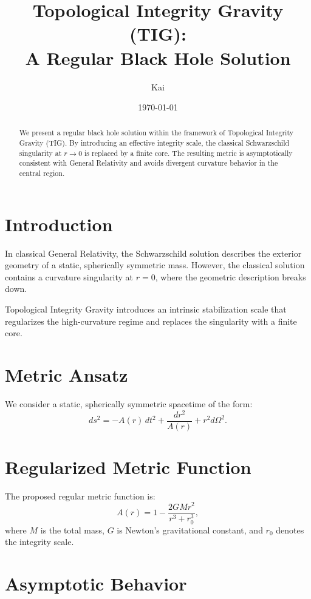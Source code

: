 \documentclass[11pt,a4paper]{article}
\title{\textbf{Topological Integrity Gravity (TIG):\\
A Regular Black Hole Solution}}
\author{Kai}
\date{\today}
\begin{document}
\maketitle

\begin{abstract}
We present a regular black hole solution within the framework of Topological Integrity Gravity (TIG). By introducing an effective integrity scale, the classical Schwarzschild singularity at \( r \to 0 \) is replaced by a finite core. The resulting metric is asymptotically consistent with General Relativity and avoids divergent curvature behavior in the central region.
\end{abstract}

\section{Introduction}

In classical General Relativity, the Schwarzschild solution describes the exterior geometry of a static, spherically symmetric mass. However, the classical solution contains a curvature singularity at \( r = 0 \), where the geometric description breaks down.

Topological Integrity Gravity introduces an intrinsic stabilization scale that regularizes the high-curvature regime and replaces the singularity with a finite core.

\section{Metric Ansatz}

We consider a static, spherically symmetric spacetime of the form:
\begin{equation}
ds^2 = -A(r)\,dt^2 + \frac{dr^2}{A(r)} + r^2 d\Omega^2 .
\end{equation}

\section{Regularized Metric Function}

The proposed regular metric function is:
\begin{equation}
A(r) = 1 - \frac{2GM r^2}{r^3 + r_0^3},
\end{equation}
where \( M \) is the total mass, \( G \) is Newton's gravitational constant, and \( r_0 \) denotes the integrity scale.

\section{Asymptotic Behavior}
\end{document}
